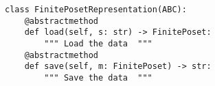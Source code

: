 \begin{verbatim}
class FinitePosetRepresentation(ABC):
    @abstractmethod
    def load(self, s: str) -> FinitePoset:
        """ Load the data  """
    @abstractmethod
    def save(self, m: FinitePoset) -> str:
        """ Save the data  """
\end{verbatim}
